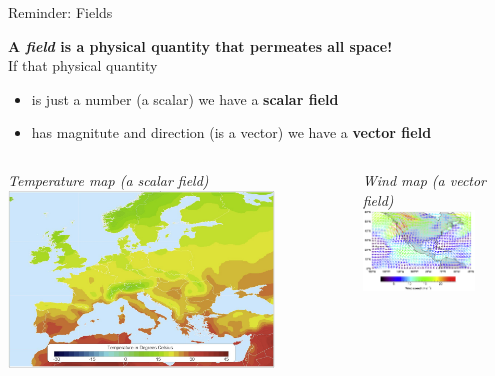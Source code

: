 {
\reminderslide

\begin{frame}{Reminder: Fields}

{\bf A {\em field} is a physical quantity that permeates all space!}\\
\vspace{0.1cm}
If that physical quantity
\begin{itemize}
  \item is just a number (a scalar) we have a {\bf scalar field}
  \item has magnitute and direction (is a vector) we have a {\bf vector field}
\end{itemize}
\begin{columns}[t]
  \begin{column}{0.47\textwidth}
   \begin{center}
     {\it \scriptsize Temperature map (a scalar field)}\\
     \vspace{0.3cm}
     \includegraphics[width=0.80\textwidth]{./images/schematics/field_scalar_eu_temp_map.png}\\
   \end{center}
  \end{column}
  \begin{column}{0.53\textwidth}
   \begin{center}
     {\it \scriptsize Wind map (a vector field)}\\
     \vspace{0.3cm}
     \includegraphics[width=0.75\textwidth]{./images/schematics/field_vector_us_wind_map.png}\\
   \end{center}
  \end{column}
\end{columns}


\end{frame}}
